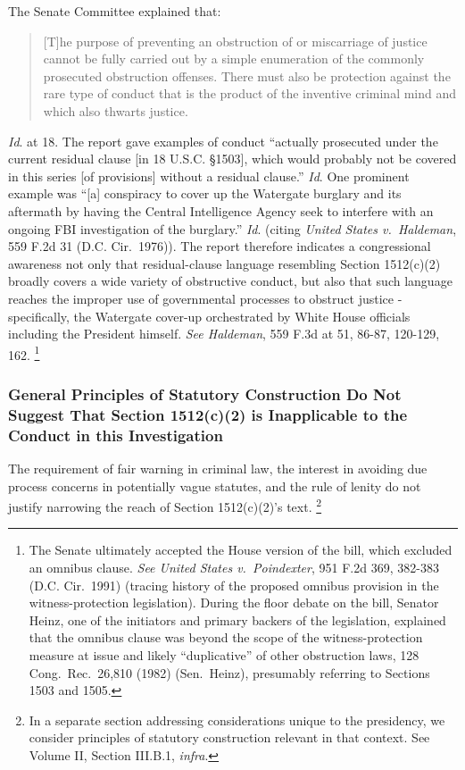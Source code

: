 The Senate Committee explained that:

\begin{quote}
[T]he purpose of preventing an obstruction of or miscarriage of justice cannot be fully carried out by a simple enumeration of the commonly prosecuted obstruction offenses.
There must also be protection against the rare type of conduct that is the product of the inventive criminal mind and which also thwarts justice.
\end{quote}

\textit{Id}. at 18.
The report gave examples of conduct “actually prosecuted under the current residual clause [in 18 U.S.C. \S 1503], which would probably not be covered in this series [of provisions] without a residual clause.”
\textit{Id}.
One prominent example was “[a] conspiracy to cover up the Watergate burglary and its aftermath by having the Central Intelligence Agency seek to interfere with an ongoing FBI investigation of the burglary.”
\textit{Id}. (citing \textit{United States v.\ Haldeman}, 559 F.2d 31 (D.C. Cir.~1976)).
The report therefore indicates a congressional awareness not only that residual-clause language resembling Section 1512(c)(2) broadly covers a wide variety of obstructive conduct, but also that such language reaches the improper use of governmental processes to obstruct justice - specifically, the Watergate cover-up orchestrated by White House officials including the President himself.
\textit{See Haldeman}, 559 F.3d at 51, 86-87, 120-129, 162.%
\footnote{The Senate ultimately accepted the House version of the bill, which excluded an omnibus clause.
\textit{See United States v.\ Poindexter}, 951 F.2d 369, 382-383 (D.C. Cir.~1991) (tracing history of the proposed omnibus provision in the witness-protection legislation).
During the floor debate on the bill, Senator Heinz, one of the initiators and primary backers of the legislation, explained that the omnibus clause was beyond the scope of the witness-protection measure at issue and likely “duplicative” of other obstruction laws, 128 Cong.\ Rec.\ 26,810 (1982) (Sen.~Heinz), presumably referring to Sections 1503 and 1505.}

\subsubsection{General Principles of Statutory Construction Do Not Suggest That Section 1512(c)(2) is Inapplicable to the Conduct in this Investigation}

The requirement of fair warning in criminal law, the interest in avoiding due process concerns in potentially vague statutes, and the rule of lenity do not justify narrowing the reach of Section 1512(c)(2)’s text.%
\footnote{In a separate section addressing considerations unique to the presidency, we consider principles of statutory construction relevant in that context.
See Volume II, Section III.B.1, \textit{infra}.}

